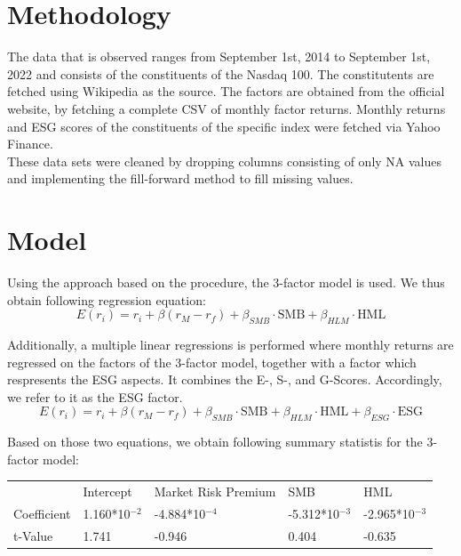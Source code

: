 \documentclass[12pt, a4paper]{article}%
\begin{document}
\section{Methodology}
The data that is observed ranges from September 1st, 2014 to September 1st, 2022 and consists of the constituents of the Nasdaq 100. The constitutents are fetched using Wikipedia as the source.
The \textcite{FamaFrench1992} factors are obtained from the official website, by fetching a complete CSV of monthly factor returns.
Monthly returns and ESG scores of the constituents of the specific index were fetched via Yahoo Finance.\\

These data sets were cleaned by dropping columns consisting of only NA values and implementing the fill-forward method to fill missing values.

\section{Model}
Using the approach based on the \textcite{FamaFrench1992} procedure, the 3-factor model is used. We thus obtain following regression equation:\\
\begin{equation} 
E(r_i) = r_i + \beta(r_M-r_f) + \beta_{SMB} \cdot\text{SMB} +  \beta_{HLM} \cdot\text{HML}
 \end{equation}

Additionally, a multiple linear regressions is performed where monthly returns are regressed on the factors of the 3-factor model, together with a factor which respresents the ESG aspects. It combines the E-, S-, and G-Scores. Accordingly, we refer to it as the ESG factor.\\
\begin{equation}
E(r_i) = r_i + \beta(r_M-r_f) + \beta_{SMB} \cdot\text{SMB} +  \beta_{HLM} \cdot\text{HML} +  \beta_{ESG}\cdot\text{ESG}
\end{equation}

Based on those two equations, we obtain following summary statistis for the 3-factor model:
\begin{table}[]
    \begin{tabular}{l|llll}
                & Intercept                      & Market Risk Premium             & SMB                             & HML                             \\
    Coefficient & 1.160*10$^{-2}$ & -4.884*10$^{-4}$ & -5.312*10$^{-3}$ & -2.965*10$^{-3}$ \\
    t-Value     & 1.741                          & -0.946                          & 0.404                           & -0.635                         
    \end{tabular}
    \end{table}
\end{document}
